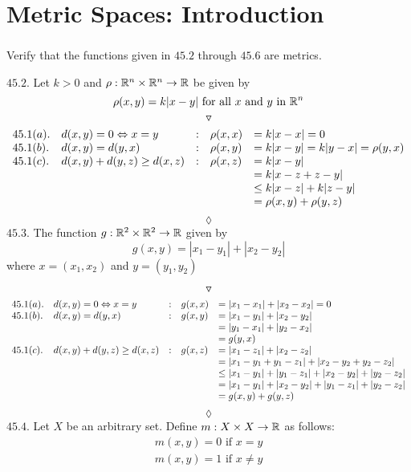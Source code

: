 \chapter{Metric Spaces: Introduction}
\pagebreak[4]

\renewcommand{\thesubsection}{\thesection.\arabic{subsection}}
\setcounter{subsection}{0}
\subsection{}
\begin{tcolorbox}
Verify that the functions given in $45.2$ through $45.6$ are metrics.
\end{tcolorbox}

$\mathbf{45.2.}$ Let $k > 0$ and $\rho :\mathbb{R}^n\times\mathbb{R}^n\rightarrow \mathbb{R}$ be given by
$$\rho(x, y) = k |x-y| \text{ for all } x \text{ and } y \text{ in }\mathbb{R}^n$$
$$\triangledown$$
\begin{align*}
\begin{array}{l l l l l}
 45.1(a).& d(x, y) = 0 \Leftrightarrow  x =y&:&\rho(x, x)& = k |x-x| = 0\\
 45.1(b). &d(x, y) = d(y, x)&:&\rho(x, y)& = k |x-y| = k |y-x|=\rho(y, x)\\
45.1 (c). &d(x,y) + d(y, z)\geq d(x, z)&:&\rho(x, z)&= k |x-y|\\
& & & &= k |x-z + z-y|\\
& & & &\leq k |x-z| + k|z-y|\\
& & & &= \rho(x, y) + \rho(y, z)
\end{array}
\end{align*}
$$\lozenge$$
$\mathbf{45.3.}$ The function $g:\mathbb{R}^2\times\mathbb{R}^2\rightarrow\mathbb{R}$ given by
$$g(x, y) = |x_1 -y_1| + |x_2 -y_2|$$
where $x=(x_1,x_2)$ and $y=(y_1,y_2)$

$$\triangledown$$
\begin{align*}
\begin{array}{l l l l l}
 45.1(a).& d(x, y) = 0 \Leftrightarrow  x =y&:&g(x, x)& =|x_1 -x_1| + |x_2 -x_2| = 0\\
 45.1(b). &d(x, y) = d(y, x)&:&g(x, y)&=|x_1 -y_1| + |x_2 -y_2|\\
 &&&&=|y_1 -x_1| + |y_2 -x_2|\\
  &&&&=g(y,x)\\
45.1 (c). &d(x,y) + d(y, z)\geq d(x, z)&:&g(x, z)&=|x_1 -z_1| + |x_2 -z_2|\\
 &&&&=|x_1 -y_1+y_1-z_1| + |x_2-y_2+y_2 -z_2|\\
 &&&&\leq|x_1 -y_1|+|y_1-z_1| + |x_2-y_2|+|y_2 -z_2|\\
 &&&&=|x_1 -y_1|+ |x_2-y_2|+|y_1-z_1| +|y_2 -z_2|\\
 &&&&=g(x,y)+g(y,z)
\end{array}
\end{align*}
$$\lozenge$$
$\mathbf{45.4.}$  Let $X$ be an arbitrary set. Define $m: X \times X \rightarrow \mathbb{R}$ as follows:
\begin{align*}
m(x,y) = 0 \text{ if } x=y\\
m(x,y)=1\text{ if } x\neq y 
\end{align*}

